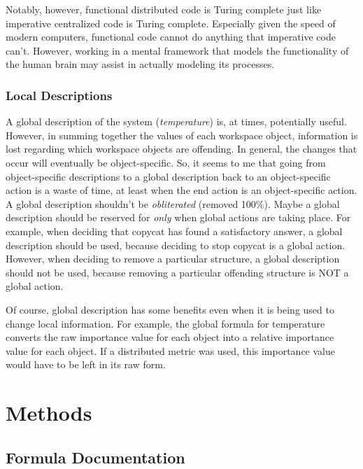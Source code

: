 \documentclass[a4paper]{article}
\begin{document}
    Notably, however, functional distributed code is Turing complete just like imperative centralized code is Turing complete.
    Especially given the speed of modern computers, functional code cannot do anything that imperative code can't.
    However, working in a mental framework that models the functionality of the human brain may assist in actually modeling its processes.

    \subsubsection{Local Descriptions}

    A global description of the system (\emph{temperature}) is, at times, potentially useful.
    However, in summing together the values of each workspace object, information is lost regarding which workspace objects are offending.
    In general, the changes that occur will eventually be object-specific.
    So, it seems to me that going from object-specific descriptions to a global description back to an object-specific action is a waste of time, at least when the end action is an object-specific action.
    A global description shouldn't be \emph{obliterated} (removed 100\%).
    Maybe a global description should be reserved for \emph{only} when global actions are taking place.
    For example, when deciding that copycat has found a satisfactory answer, a global description should be used, because deciding to stop copycat is a global action.
    However, when deciding to remove a particular structure, a global description should not be used, because removing a particular offending structure is NOT a global action.

    Of course, global description has some benefits even when it is being used to change local information.
    For example, the global formula for temperature converts the raw importance value for each object into a relative importance value for each object.
    If a distributed metric was used, this importance value would have to be left in its raw form.

\section{Methods}

    \subsection{Formula Documentation}
\end{document}
